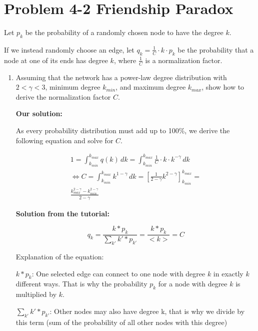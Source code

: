 \section{Problem 4-2 Friendship Paradox}

Let $p_k$ be the probability of a randomly chosen node to have the degree $k$.

If we instead randomly choose an edge, let $q_k = \frac{1}{C} \cdot k \cdot p_k$ be the probability that a node at one of its ends has degree $k$, where $\frac{1}{C}$ is a normalization factor.

\begin{enumerate}
	\item Assuming that the network has a power-law degree distribution with $2 < \gamma
< 3$, minimum degree $k_{min}$, and maximum degree $k_{max}$, show how to derive the normalization factor $C$.

	\textbf{Our solution:}
	
	As every probability distribution must add up to 100\%, we derive the following equation and solve for $C$.

	\begin{equation}
		\begin{split}
		1 = \int_{k_{min}}^{k_{max}} q(k) \, dk = \int_{k_{min}}^{k_{max}} \frac{1}{C} \cdot k \cdot k^{-\gamma} \, dk \\
		\Leftrightarrow C = \int_{k_{min}}^{k_{max}} k^{1-\gamma} \, dk = [\frac{1}{2-\gamma} k^{2-\gamma}]_{k_{min}}^{k_{max}} = \\
		\frac{k_{max}^{2-\gamma} - k_{min}^{2-\gamma}}{2-\gamma}
		\end{split}
	\end{equation}
	
	\textbf{Solution from the tutorial:}
	
	\begin{equation}
	q_k = \frac{k * p_k}{\sum_{k'}^{} k' * p_{k'}} = \frac{k * p_k}{<k>} = C
	\end{equation}
	
	Explanation of the equation:
	
	$k * p_k$: One selected edge can connect to one node with degree $k$ in exactly $k$ different ways. That is why the probability $p_k$ for a node with degree $k$ is multiplied by $k$.
	
	$\sum_{k'}^{} k' * p_{k'}$: Other nodes may also have degree k, that is why we divide by this term (sum of the probability of all other nodes with this degree)
	

\end{enumerate}
